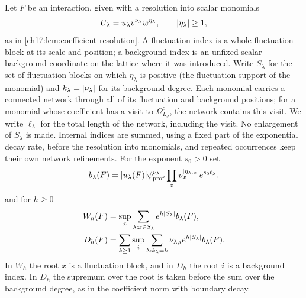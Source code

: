 \begin{definition}\label{ch17:def:rooted-norms}
Let $F$ be an interaction, given with a resolution into scalar monomials
\[
 U_\lambda=u_\lambda v^{\nu_\lambda}w^{\eta_\lambda},\qquad\lvert \eta_\lambda\rvert\ge1,
\]
as in \cref{ch17:lem:coefficient-resolution}. A fluctuation index is a whole fluctuation block at its scale and position; a background index is an unfixed scalar background coordinate on the lattice where it was introduced. Write $S_\lambda$ for the set of fluctuation blocks on which $\eta_\lambda$ is positive (the fluctuation support of the monomial) and $k_\lambda=\lvert \nu_\lambda\rvert$ for its background degree. Each monomial carries a connected network through all of its fluctuation and background positions; for a monomial whose coefficient has a visit to $\Omega^c_{L_J}$, the network contains this visit. We write $\ell_\lambda$ for the total length of the network, including the visit. No enlargement of $S_\lambda$ is made. Internal indices are summed, using a fixed part of the exponential decay rate, before the resolution into monomials, and repeated occurrences keep their own network refinements. For the exponent $s_0>0$ set
\[
 b_\lambda(F)=\lvert u_\lambda(F)\rvert\psi_{\mathrm{prof}}^{\nu_\lambda}\prod_xp_x^{\lvert \eta_{\lambda,x}\rvert}e^{s_0\ell_\lambda},
\]
and for $h\ge0$
\begin{align*}
 W_h(F)&=\sup_x\sum_{\lambda:x\in S_\lambda}e^{h\lvert S_\lambda\rvert}b_\lambda(F),\\
 D_h(F)&=\sum_{k\ge1}\sup_i\sum_{\lambda:k_\lambda=k}\nu_{\lambda,i}e^{h\lvert S_\lambda\rvert}b_\lambda(F).
\end{align*}
In $W_h$ the root $x$ is a fluctuation block, and in $D_h$ the root $i$ is a background index. In $D_h$ the supremum over the root is taken before the sum over the background degree, as in the coefficient norm with boundary decay.
\end{definition}

